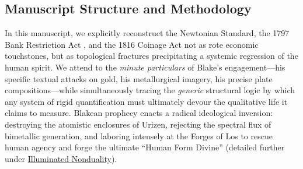 \documentclass[
]{article}
\begin{document}
\subsection{Manuscript Structure and
Methodology}\label{manuscript-structure-and-methodology}

In this manuscript, we explicitly reconstruct the Newtonian Standard,
the 1797 Bank Restriction Act
\citep{clapham1944bank, fetter1965development}, and the 1816 Coinage Act
\citep{redish1990evolution} not as rote economic touchstones, but as
topological fractures precipitating a systemic regression of the human
spirit. We attend to the \emph{minute particulars} of Blake's
engagement---his specific textual attacks on gold, his metallurgical
imagery, his precise plate compositions---while simultaneously tracing
the \emph{generic} structural logic by which any system of rigid
quantification must ultimately devour the qualitative life it claims to
measure. Blakean prophecy enacts a radical ideological inversion:
destroying the atomistic enclosures of Urizen, rejecting the spectral
flux of bimetallic generation, and laboring intensely at the Forges of
Los to rescue human agency and forge the ultimate ``Human Form Divine''
(detailed further under
\href{04a_illuminated_nonduality.md\#illuminated-nonduality-and-the-fourfold-vision}{Illuminated
Nonduality}).
\end{document}
